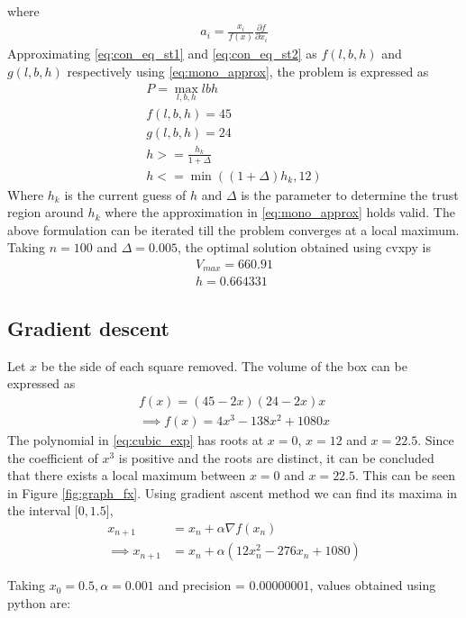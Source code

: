 \documentclass[journal,10pt,twocolumn]{article}
\providecommand{\brak}[1]{\ensuremath{\left(#1\right)}}
\begin{document}
where
\begin{align}
	a_i = \frac{x_i}{f(x)}\frac{\partial{f}}{\partial{x_i}}
\end{align}
Approximating \eqref{eq:con_eq_st1} and \eqref{eq:con_eq_st2} as $f(l,b,h)$ and $g(l,b,h)$ respectively using \eqref{eq:mono_approx}, the problem is expressed as
\begin{align}
	P = \max_{l,b,h}lbh\\
	f(l,b,h) = 45\\
	g(l,b,h) = 24\\
	h >= \frac{h_k}{1+\Delta}\\
	h <= \min((1+\Delta)h_k, 12)
\end{align}
Where $h_k$ is the current guess of $h$ and $\Delta$ is the parameter to determine the trust region around $h_k$ where the approximation in \eqref{eq:mono_approx} holds valid.
The above formulation can be iterated till the problem converges at a local maximum. Taking $n = 100$ and $\Delta = 0.005$, the optimal solution obtained using cvxpy is
\begin{align}
	\boxed{V_{max} = 660.91}\\
	\boxed{h = 0.664331}
\end{align}
\subsection*{\normalsize Gradient descent}
Let $x$ be the side of each square removed. The volume of the box can be expressed as
\begin{align}
	\label{eq:vol_varx}
	f(x) = (45-2x)(24-2x)x\\
	\implies f(x) = 4x^3-138x^2+1080x
	\label{eq:cubic_exp}
\end{align}
The polynomial in \eqref{eq:cubic_exp} has roots at $x = 0$, $x = 12$ and $x = 22.5$. Since the coefficient of $x^3$ is positive and the roots are distinct, it can be concluded that there exists a local maximum between $x = 0$ and $x = 22.5$. This can be seen in Figure \ref{fig:graph_fx}.
Using gradient ascent method we can find its maxima in the interval $\mathbf{[}0,1.5\mathbf{]}$,
    \begin{align}
        x_{n+1} &= x_n + \alpha \nabla f(x_n) \\
        \implies x_{n+1} &= x_n + \alpha \brak{12x_n^2-276x_n+1080}
    \end{align}
    
Taking $x_0=0.5,\alpha=0.001$ and precision = 0.00000001, values obtained using python are:
    
\end{document}
